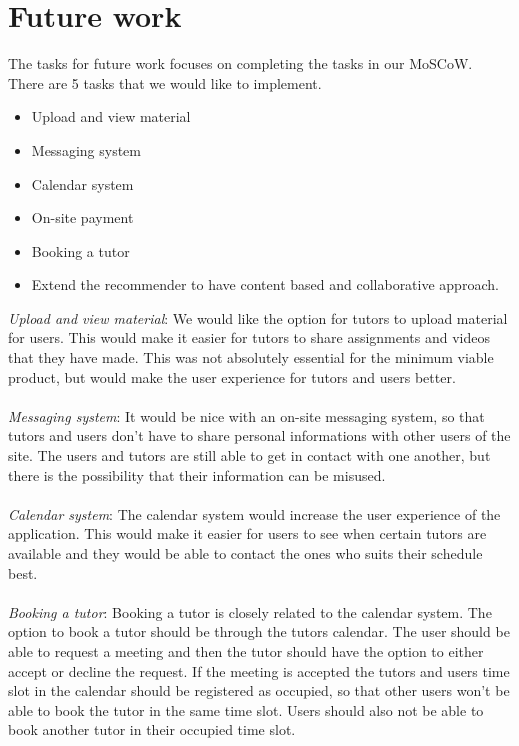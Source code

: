 \section{Future work}
The tasks for future work focuses on completing the tasks in our MoSCoW.
There are 5 tasks that we would like to implement.

\begin{itemize}
    \item Upload and view material
    \item Messaging system
    \item Calendar system
    \item On-site payment
    \item Booking a tutor
    \item Extend the recommender to have content based and collaborative approach.
\end{itemize}
\noindent
\textit{Upload and view material}:
We would like the option for tutors to upload material for users. 
This would make it easier for tutors to share assignments and videos that they have made. 
This was not absolutely essential for the minimum viable product, but would make the user experience for tutors and users better.
\\\\
\textit{Messaging system}: 
It would be nice with an on-site messaging system, so that tutors and users don't have to share personal informations with other users of the site.
The users and tutors are still able to get in contact with one another, but there is the possibility that their information can be misused.
\\\\
\textit{Calendar system}:
The calendar system would increase the user experience of the application. 
This would make it easier for users to see when certain tutors are available and they would be able to contact the ones who suits their schedule best.
\\\\
\textit{Booking a tutor}:
Booking a tutor is closely related to the calendar system.
The option to book a tutor should be through the tutors calendar. 
The user should be able to request a meeting and then the tutor should have the option to either accept or decline the request.
If the meeting is accepted the tutors and users time slot in the calendar should be registered as occupied, so that other users won't be able to book the tutor in the same time slot.
Users should also not be able to book another tutor in their occupied time slot.
